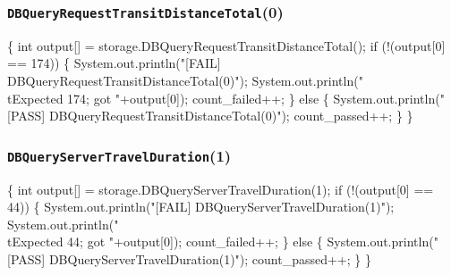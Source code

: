 \documentclass{article}
\def\nwendcode{\endtrivlist \endgroup}
\let\nwdocspar=\par
\begin{document}
\subsubsection{{\tt{}DBQueryRequestTransitDistanceTotal}(0)}
\nwenddocs{}\endmoddef{}
\{
  int output[] = storage.DBQueryRequestTransitDistanceTotal();
  if (!(output[0] == 174)) \{
    System.out.println("[FAIL] DBQueryRequestTransitDistanceTotal(0)");
    System.out.println("\\tExpected 174; got "+output[0]);
    count_failed++;
  \} else \{
    System.out.println("[PASS] DBQueryRequestTransitDistanceTotal(0)");
    count_passed++;
  \}
\}
\nwendcode{}\nwdocspar
\subsubsection{{\tt{}DBQueryServerTravelDuration}(1)}
\nwenddocs{}\endmoddef{}
\{
  int output[] = storage.DBQueryServerTravelDuration(1);
  if (!(output[0] == 44)) \{
    System.out.println("[FAIL] DBQueryServerTravelDuration(1)");
    System.out.println("\\tExpected 44; got "+output[0]);
    count_failed++;
  \} else \{
    System.out.println("[PASS] DBQueryServerTravelDuration(1)");
    count_passed++;
  \}
\}
\nwendcode{}\nwdocspar
\end{document}
